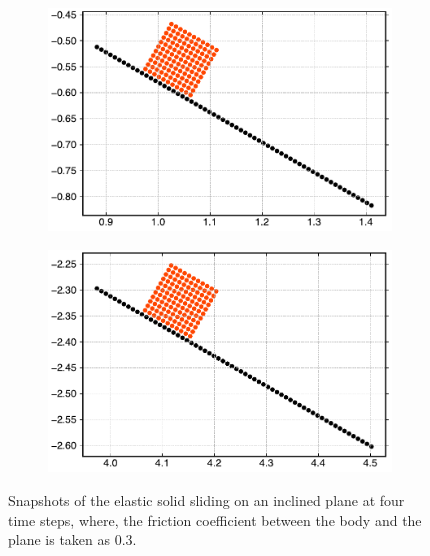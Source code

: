 \begin{figure}[!htpb]
  \begin{subfigure}{0.48\textwidth}
    \centering
    \includegraphics[width=1.0\textwidth]{figures/csph/figures/mohseni_2021_free_sliding_on_a_slope/fric_coeff_0_3/time2}
    \label{fig:passing-2}
  \end{subfigure}
  \begin{subfigure}{0.48\textwidth}
    \centering
    \includegraphics[width=1.0\textwidth]{figures/csph/figures/mohseni_2021_free_sliding_on_a_slope/fric_coeff_0_3/time3}
    \label{fig:passing-3}
  \end{subfigure}
  \caption{Snapshots of the elastic solid sliding on an inclined plane at
    four time steps, where, the friction coefficient between the body and
    the plane is taken as $0.3$.}
\label{fig:mohseni-2021-sliding}
\end{figure}
%

